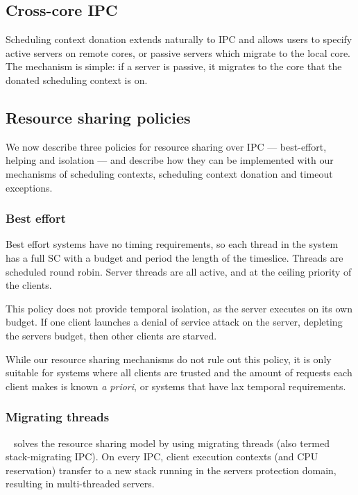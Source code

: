 \subsection{Cross-core IPC}


Scheduling context donation extends naturally to IPC and allows users to specify active servers on
remote cores, or passive servers which migrate to the local core. The mechanism is simple: if a
server is passive, it migrates to the core that the donated scheduling context is on. 

\subsection{Resource sharing policies}

We now describe three policies for resource sharing over \gls{IPC} --- best-effort, helping and
isolation --- and describe how they can be implemented 
with our mechanisms of scheduling contexts, scheduling context donation and timeout exceptions.


\subsubsection{Best effort}
\label{sec:best-effort}

Best effort systems have no timing requirements, so each thread in the system has a full \gls{SC}
with a budget and period the length of the timeslice. Threads are scheduled round robin. Server
threads are all active, and at the ceiling priority of the clients. 

This policy does not provide temporal isolation, as the server executes on its own budget.  If one
client launches a denial of service attack on the server, depleting the servers budget, then other
clients are starved. 

While our resource sharing mechanisms do not rule out this policy, it is only suitable for
systems where all clients are trusted and the amount of requests each client makes is known \emph{a
priori}, or systems that have lax temporal requirements.

\subsubsection{Migrating threads}

\composite~\citep{Parmer_10} solves the resource sharing model by using migrating threads (also termed stack-migrating IPC).
On every IPC, client execution contexts (and CPU reservation) transfer to a new stack running in the servers protection domain, resulting in multi-threaded servers.

